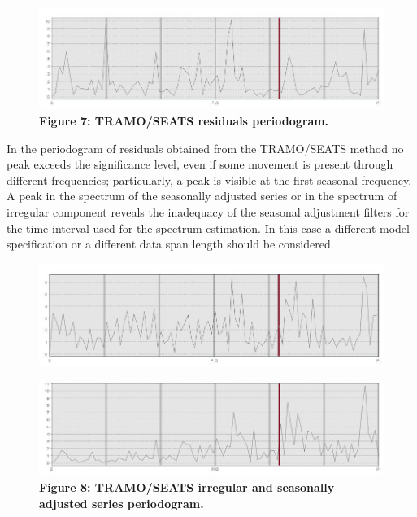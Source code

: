 \documentclass{article}
\begin{document}
\begin{figure}[H]
\centering
  \includegraphics[width=\linewidth]{../images/capitolo3/perRES.jpg}
  {\textbf{\scriptsize Figure 7: TRAMO/SEATS residuals periodogram.}}
\end{figure}
In the periodogram of residuals obtained from the TRAMO/SEATS method no peak exceeds the significance level, even if some movement is present through different frequencies; particularly, a peak is visible at the first seasonal frequency. A peak in the spectrum of the seasonally adjusted series or in the spectrum of irregular component reveals the inadequacy of the seasonal adjustment filters for the time interval used for the spectrum estimation. In this case a different model specification or a different data span length should be considered.
\begin{figure}[H]
  \includegraphics[width=\linewidth]{../images/capitolo3/perIRR.jpg}
\end{figure}
\begin{figure}[H]
\centering
  \includegraphics[width=\linewidth]{../images/capitolo3/perSA.jpg}
  {\textbf{\scriptsize Figure 8: TRAMO/SEATS irregular and seasonally adjusted series periodogram.}}
\end{figure}
\end{document}
